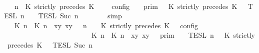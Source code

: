 \begin{isabellebody}
\ {\isacharminus}\isanewline
\ \ \ \ \isamarkupfalse%
\ {\isacartoucheopen}{\isasymlbrakk}\ {\isasymGamma}{\isacharcomma}\ n\ {\isasymturnstile}\ {\isacharparenleft}K\ strictly\ precedes\ K\ {\isacharhash}\ {\isasymPsi}\ {\isasymtriangleright}\ {\isasymPhi}\ {\isasymrbrakk}\isactrlsub c\isactrlsub o\isactrlsub n\isactrlsub f\isactrlsub i\isactrlsub g\ {\isacharequal}\ {\isasymlbrakk}{\isasymlbrakk}\ {\isasymGamma}\ {\isasymrbrakk}{\isasymrbrakk}\isactrlsub p\isactrlsub r\isactrlsub i\isactrlsub m\ {\isasyminter}\ {\isasymlbrakk}{\isasymlbrakk}\ {\isacharparenleft}K\ strictly\ precedes\ K\ {\isacharhash}\ {\isasymPsi}\ {\isasymrbrakk}{\isasymrbrakk}\isactrlsub T\isactrlsub E\isactrlsub S\isactrlsub L\isactrlbsup {\isasymge}\ n\isactrlesup \ {\isasyminter}\ {\isasymlbrakk}{\isasymlbrakk}\ {\isasymPhi}\ {\isasymrbrakk}{\isasymrbrakk}\isactrlsub T\isactrlsub E\isactrlsub S\isactrlsub L\isactrlbsup {\isasymge}\ Suc\ n\isactrlesup {\isacartoucheclose}\isanewline
\ \ \ \ \ \ \isamarkupfalse%
\ simp\isanewline
\ \ \ \ \isamarkupfalse%
\ \isamarkupfalse%
\ {\isacartoucheopen}{\isasymlbrakk}\ {\isacharparenleft}{\isacharparenleft}{\isasymlceil}{\isacharhash}\isactrlsup {\isasymle}\ K\ n{\isacharcomma}\ {\isacharhash}\isactrlsup {\isacharless}\ K\ n{\isasymrceil}\ {\isasymin}\ {\isacharparenleft}{\isasymlambda}{\isacharparenleft}x{\isacharcomma}y{\isacharparenright}{\isachardot}\ x{\isasymle}y{\isacharparenright}{\isacharparenright}\ {\isacharhash}\ {\isasymGamma}{\isacharparenright}{\isacharcomma}\ n\ {\isasymturnstile}\ {\isasymPsi}\ {\isasymtriangleright}\ {\isacharparenleft}{\isacharparenleft}K\ strictly\ precedes\ K\ {\isacharhash}\ {\isasymPhi}{\isacharparenright}\ {\isasymrbrakk}\isactrlsub c\isactrlsub o\isactrlsub n\isactrlsub f\isactrlsub i\isactrlsub g\isanewline
\ \ \ \ \ \ \ \ \ \ \ \ \ \ \ \ \ \ \ \ \ \ {\isacharequal}\ {\isasymlbrakk}{\isasymlbrakk}\ {\isacharparenleft}{\isasymlceil}{\isacharhash}\isactrlsup {\isasymle}\ K\ n{\isacharcomma}\ {\isacharhash}\isactrlsup {\isacharless}\ K\ n{\isasymrceil}\ {\isasymin}\ {\isacharparenleft}{\isasymlambda}{\isacharparenleft}x{\isacharcomma}y{\isacharparenright}{\isachardot}\ x{\isasymle}y{\isacharparenright}{\isacharparenright}\ {\isacharhash}\ {\isasymGamma}\ {\isasymrbrakk}{\isasymrbrakk}\isactrlsub p\isactrlsub r\isactrlsub i\isactrlsub m\ {\isasyminter}\ {\isasymlbrakk}{\isasymlbrakk}\ {\isasymPsi}\ {\isasymrbrakk}{\isasymrbrakk}\isactrlsub T\isactrlsub E\isactrlsub S\isactrlsub L\isactrlbsup {\isasymge}\ n\isactrlesup \ {\isasyminter}\ {\isasymlbrakk}{\isasymlbrakk}\ {\isacharparenleft}K\ strictly\ precedes\ K\ {\isacharhash}\ {\isasymPhi}\ {\isasymrbrakk}{\isasymrbrakk}\isactrlsub T\isactrlsub E\isactrlsub S\isactrlsub L\isactrlbsup {\isasymge}\ Suc\ n\isactrlesup {\isacartoucheclose}\isanewline

\end{isabellebody}
